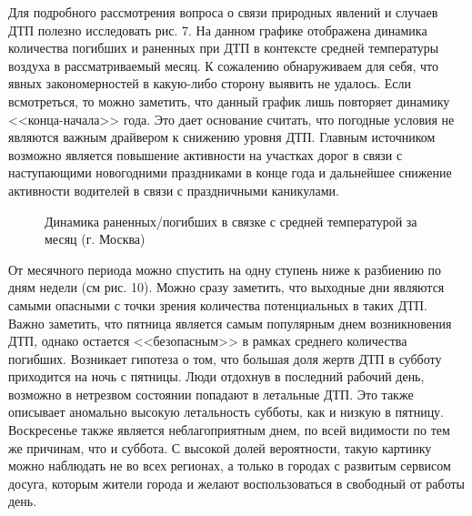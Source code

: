 \documentclass[a4paper, 14pt]{article}
\begin{document}
Для подробного рассмотрения вопроса о связи природных явлений и случаев ДТП полезно исследовать рис. 7. На данном графике отображена динамика количества погибших и раненных при ДТП в контексте средней температуры воздуха в рассматриваемый месяц. К сожалению обнаруживаем для себя, что явных закономерностей в какую-либо сторону выявить не удалось. Если всмотреться, то можно заметить, что данный график лишь повторяет динамику <<конца-начала>> года. Это дает основание считать, что погодные условия не являются важным драйвером к снижению уровня ДТП. Главным источником возможно является повышение активности на участках дорог в связи с наступающими новогодними праздниками в конце года и дальнейшее снижение активности водителей в связи с праздничными каникулами. 

\begin{figure}[h]
	\caption{Динамика раненных/погибших в связке с средней температурой за месяц (г. Москва)}
\end{figure}

От месячного периода можно спустить на одну ступень ниже к разбиению по дням недели (см рис. 10). Можно сразу заметить, что выходные дни являются самыми опасными с точки зрения количества потенциальных в таких ДТП. Важно заметить, что пятница является самым популярным днем возникновения ДТП, однако остается <<безопасным>> в рамках среднего количества погибших. Возникает гипотеза о том, что большая доля жертв ДТП в субботу приходится на ночь с пятницы. Люди отдохнув в последний рабочий день, возможно в нетрезвом состоянии попадают в летальные ДТП. Это также описывает аномально высокую летальность субботы, как и низкую в пятницу. Воскресенье также является неблагоприятным днем, по всей видимости по тем же причинам, что и суббота. С высокой долей вероятности, такую картинку можно наблюдать не во всех регионах, а только в городах с развитым сервисом досуга, которым жители города и желают воспользоваться в свободный от работы день.
\end{document}
